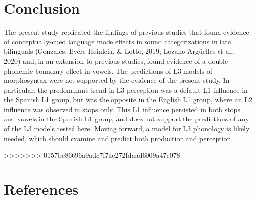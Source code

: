 \documentclass[
  english,
  man]{apa6}
\begin{document}
\hypertarget{conclusion}{%
\section{Conclusion}\label{conclusion}}

The present study replicated the findings of previous studies that found evidence of conceptually-cued language mode effects in sound categorizations in late bilinguals (Gonzales, Byers-Heinlein, \& Lotto, 2019; Lozano-Argüelles et al., 2020) and, in an extension to previous studies, found evidence of a double phonemic boundary effect in vowels.
The predictions of L3 models of morphosyntax were not supported by the evidence of the present study. In particular, the predominant trend in L3 perception was a default L1 influence in the Spanish L1 group, but was the opposite in the English L1 group, where an L2 influence was observed in stops only.
This L1 influence persisted in both stops and vowels in the Spanish L1 group, and does not support the predictions of any of the L3 models tested here. Moving forward, a model for L3 phonology is likely needed, which should examine and predict both production and perception.

>>>>>>> 0157be86696a9adc7f7de272fdaad6009a47c078
\hypertarget{references}{%
\section{References}\label{references}}

\begingroup
\setlength{\parindent}{-0.5in}
\setlength{\leftskip}{0.5in}
\end{document}
